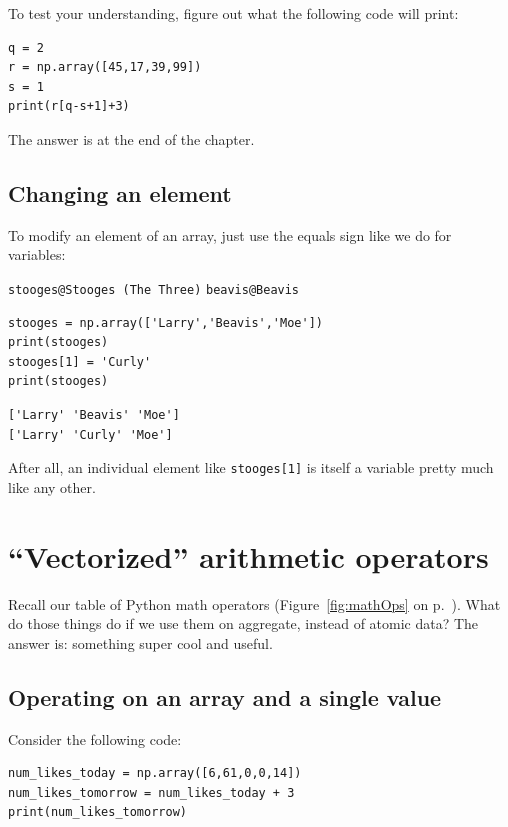 To test your understanding, figure out what the following code will print:

\label{indexTest}
\begin{Verbatim}[fontsize=\small,samepage=true,frame=single,framesep=3mm]
q = 2
r = np.array([45,17,39,99])
s = 1
print(r[q-s+1]+3)
\end{Verbatim}

The answer is at the end of the chapter.

\subsection{Changing an element}

To modify an element of an array, just use the equals sign like we do for
variables:

\texttt{stooges@Stooges (The Three)}
\texttt{beavis@Beavis}
\begin{Verbatim}[fontsize=\small,samepage=true,frame=single,framesep=3mm]
stooges = np.array(['Larry','Beavis','Moe'])
print(stooges)
stooges[1] = 'Curly'
print(stooges)
\end{Verbatim}

\begin{Verbatim}[fontsize=\small,samepage=true,frame=leftline,framesep=5mm,framerule=1mm]
['Larry' 'Beavis' 'Moe']
['Larry' 'Curly' 'Moe']
\end{Verbatim}

After all, an individual element like \texttt{stooges[1]} is itself a variable
pretty much like any other.


\section{``Vectorized'' arithmetic operators}

Recall our table of Python math operators (Figure~\ref{fig:mathOps} on
p.~\pageref{fig:mathOps}). What do those things do if we use them on aggregate,
instead of atomic data? The answer is: something super cool and useful.

\subsection{Operating on an array and a single value}

Consider the following code:

\label{vectorizedArrayIntExample}
\begin{Verbatim}[fontsize=\small,samepage=true,frame=single]
num_likes_today = np.array([6,61,0,0,14])
num_likes_tomorrow = num_likes_today + 3
print(num_likes_tomorrow)
\end{Verbatim}

